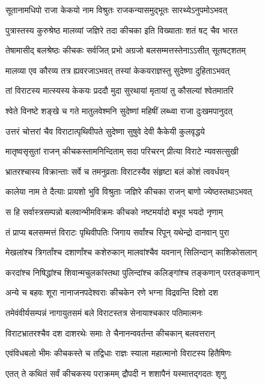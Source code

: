 \twolineshloka
{सूतानामधिपो राजा केकयो नाम विश्रुतः}
{राजकन्यासमुद्भूतः सारथ्येऽनुपमोऽभवत्}


\twolineshloka
{पुत्रास्तस्य कुरुश्रेष्ठ मालव्यां जज्ञिरे तदा}
{कीचका इति विख्याताः शतं षट् चैव भारत}


\twolineshloka
{तेषामासीद् बलश्रेष्ठः कीचकः सर्वजित् प्रभो}
{अग्रजो बलसम्मत्तस्तेनाऽऽसीत् सूतषट्शतम्}


\twolineshloka
{मालव्या एव कौरव्य तत्र ह्यवरजाऽभवत्}
{तस्यां केकयराज्ञस्तु सुदेष्णा दुहिताऽभवत्}


\twolineshloka
{तां विराटस्य मात्स्यस्य केकयः प्रददौ मुदा}
{सुरथायां मृतायां तु कौसल्यां श्वेतमातरि}


\twolineshloka
{श्वेते विनष्टे शङ्खे च गते मातुलवेश्मनि}
{सुदेष्णां महिषीं लब्ध्वा राजा दुःखमपानुदत्}


\twolineshloka
{उत्तरं चोत्तरां चैव विराटात्पृथिवीपते}
{सुदेष्णा सुषुवे देवी कैकेयी कुलवृद्धये}


\twolineshloka
{मातृष्वसृसुतां राजन् कीचकस्तामनिन्दिताम्}
{सदा परिचरन् प्रीत्या विराटे न्यवसत्सुखी}


\twolineshloka
{भ्रातरश्चास्य विक्रान्ताः सर्वे च तमनुव्रताः}
{विराटस्यैव संहृष्टा बलं कोशं त्ववर्धयन्}


\twolineshloka
{कालेया नाम ते दैत्याः प्रायशो भुवि विश्रुताः}
{जज्ञिरे कीचका राजन् बाणो ज्येष्ठस्तथाऽभवत्}


\twolineshloka
{स हि सर्वास्त्रसम्पन्नो बलवान्भीमविक्रमः}
{कीचको नष्टमर्यादो बभूव भयदो नृणाम्}


\twolineshloka
{तं प्राप्य बलसम्मत्तं विराटः पृथिवीपतिः}
{जिगाय सर्वांश्च रिपून् यथेन्द्रो दानवान् पुरा}


\twolineshloka
{मेखलांश्च त्रिगर्तांश्च दशार्णांश्च कशेरुकान्}
{मालवांश्चैव यवनान् सिलिन्दान् काशिकोसलान्}


\twolineshloka
{करदांश्च निषिद्धांश्च शिवान्मचुलकांस्तथा}
{पुलिन्दांश्च कलिङ्गांश्च तङ्कणान् परतङ्कणान्}


\twolineshloka
{अन्ये च बहवः शूरा नानाजनपदेश्वराः}
{कीचकेन रणे भग्ना विद्रवन्ति दिशो दश}


\twolineshloka
{तमेवंवीर्यसम्पन्नं नागायुतसमं बले}
{विराटस्तत्र सेनायाश्चकार पतिमात्मनः}


\twolineshloka
{विराटभ्रातरश्चैव दश दाशरथेः समाः}
{ते चैनानन्ववर्तन्त कीचकान् बलवत्तरान्}


\twolineshloka
{एवंविधबलो भीमः कीचकस्ते च तद्विधाः}
{राज्ञः स्याला महात्मानो विराटस्य हितैषिणः}


\twolineshloka
{एतत् ते कथितं सर्वं कीचकस्य पराक्रमम्}
{द्रौपदी न शशापैनं यस्मात्तद्गदतः शृणु}


